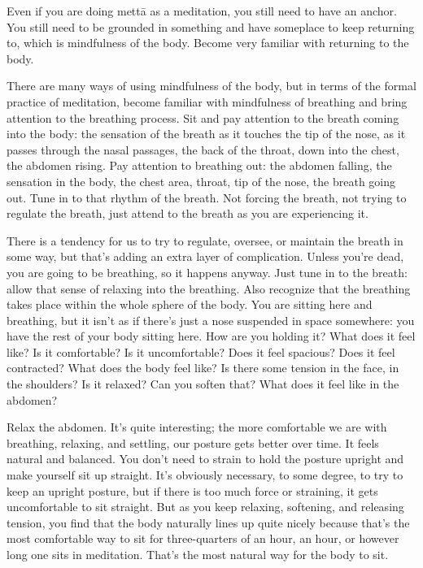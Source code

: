 Even if you are doing mettā as a meditation, you still need to have an
anchor. You still need to be grounded in something and have someplace to
keep returning to, which is mindfulness of the body. Become very
familiar with returning to the body.

There are many ways of using mindfulness of the body, but in terms of
the formal practice of meditation, become familiar with mindfulness of
breathing and bring attention to the breathing process. Sit and pay
attention to the breath coming into the body: the sensation of the
breath as it touches the tip of the nose, as it passes through the nasal
passages, the back of the throat, down into the chest, the abdomen
rising. Pay attention to breathing out: the abdomen falling, the
sensation in the body, the chest area, throat, tip of the nose, the
breath going out. Tune in to that rhythm of the breath. Not forcing the
breath, not trying to regulate the breath, just attend to the breath as
you are experiencing it.

There is a tendency for us to try to regulate, oversee, or maintain the
breath in some way, but that’s adding an extra layer of complication.
Unless you’re dead, you are going to be breathing, so it happens anyway.
Just tune in to the breath: allow that sense of relaxing into the
breathing. Also recognize that the breathing takes place within the
whole sphere of the body. You are sitting here and breathing, but it
isn’t as if there’s just a nose suspended in space somewhere: you have
the rest of your body sitting here. How are you holding it? What does it
feel like? Is it comfortable? Is it uncomfortable? Does it feel
spacious? Does it feel contracted? What does the body feel like? Is
there some tension in the face, in the shoulders? Is it relaxed? Can you
soften that? What does it feel like in the abdomen?

Relax the abdomen. It’s quite interesting; the more comfortable we are
with breathing, relaxing, and settling, our posture gets better over
time. It feels natural and balanced. You don’t need to strain to hold
the posture upright and make yourself sit up straight. It’s obviously
necessary, to some degree, to try to keep an upright posture, but if
there is too much force or straining, it gets uncomfortable to sit
straight. But as you keep relaxing, softening, and releasing tension,
you find that the body naturally lines up quite nicely because that’s
the most comfortable way to sit for three-quarters of an hour, an hour,
or however long one sits in meditation. That’s the most natural way for
the body to sit.

